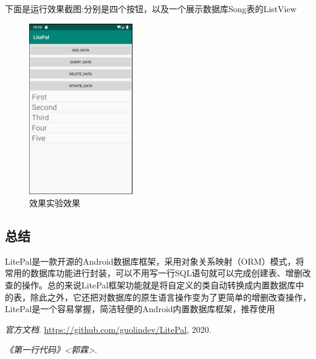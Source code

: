 \documentclass[cs4size,a4paper]{ctexart}
\numberwithin{equation}{section}
\numberwithin{table}{section}
\numberwithin{figure}{section}
\begin{document}
下面是运行效果截图:分别是四个按钮，以及一个展示数据库Song表的ListView
\begin{figure}[H]
\small
\centering
\includegraphics[width=0.4\textwidth]{result111}
\caption{效果实验效果} \label{实验效果}

\end{figure}
\subsection{总结}
LitePal是一款开源的Android数据库框架，采用对象关系映射（ORM）模式，将常用的数据库功能进行封装，可以不用写一行SQL语句就可以完成创建表、增删改查的操作。总的来说LitePal框架功能就是将自定义的类自动转换成内置数据库中的表，除此之外，它还把对数据库的原生语言操作变为了更简单的增删改查操作，LitePal是一个容易掌握，简洁轻便的Android内置数据库框架，推荐使用~~



%
                         
\begin{thebibliography}{99}
{\em \color{red}官方文档}. \url{https://github.com/guolindev/LitePal}, 2020.

{\em \color{red}《第一行代码》<郭霖>}.
\end{thebibliography}
\end{document}
